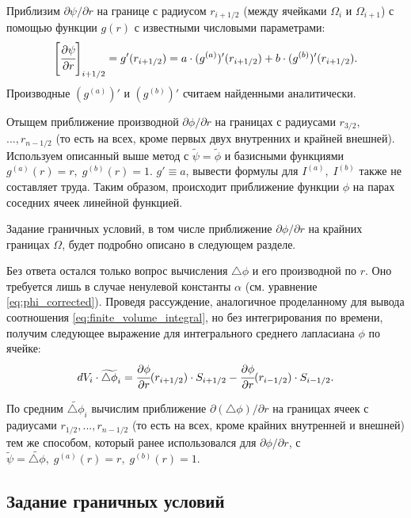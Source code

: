 Приблизим $\partial \psi / \partial r$ на границе с радиусом $r_{i + 1/2}$ (между ячейками $\Omega_i$ и $\Omega_{i + 1}$) с помощью функции $g(r)$ с известными числовыми параметрами:
$$\left[ \cfrac{\partial \psi}{\partial r} \right]_{i + 1/2} = g'(r_{i + 1/2}) = a \cdot (g^{(a)})'(r_{i + 1/2}) + b \cdot (g^{(b)})'(r_{i + 1/2}) {\text{.}}$$
Производные $(g^{(a)})'$ и $(g^{(b)})'$ считаем найденными аналитически.

Отыщем приближение производной $\partial \phi / \partial r$ на границах с радиусами $r_{3/2},$ $..., r_{n - 1/2}$ (то есть на всех, кроме первых двух внутренних и крайней внешней). Используем описанный выше метод с $\widetilde{\psi} = \widetilde{\phi}$ и базисными функциями $g^{(a)}(r) = r, \; g^{(b)}(r) = 1$. $g' \equiv a$, вывести формулы для $I^{(a)}, \; I^{(b)}$ также не составляет труда. Таким образом, происходит приближение функции $\phi$ на парах соседних ячеек линейной функцией.

Задание граничных условий, в том числе приближение $\partial \phi / \partial r$ на крайних границах $\Omega$, будет подробно описано в следующем разделе.

Без ответа остался только вопрос вычисления $\triangle \phi$ и его производной по $r$. Оно требуется лишь в случае ненулевой константы $\alpha$ (см. уравнение \eqref{eq:phi_corrected}). Проведя рассуждение, аналогичное проделанному для вывода соотношения \eqref{eq:finite_volume_integral}, но без интегрирования по времени, получим следующее выражение для интегрального среднего лапласиана $\phi$ по ячейке:
\begin{equation}
    dV_i \cdot \widetilde{\triangle \phi}_i = \cfrac{\partial \phi}{\partial r} (r_{i + 1/2}) \cdot S_{i + 1/2} - \cfrac{\partial \phi}{\partial r} (r_{i - 1/2}) \cdot S_{i - 1/2} {\text{.}}
    \label{eq:finite_volume_laplasian}
\end{equation}

По средним $\widetilde{\triangle \phi}_i$ вычислим приближение $\partial (\triangle \phi) / \partial r$ на границах ячеек с радиусами $r_{1/2}, ..., r_{n - 1/2}$ (то есть на всех, кроме крайних внутренней и внешней) тем же способом, который ранее использовался для $\partial \phi / \partial r$, с $\widetilde{\psi} = \widetilde{\triangle \phi}, \; g^{(a)}(r) = r, \; g^{(b)}(r) = 1$.


\subsection{Задание граничных условий}


